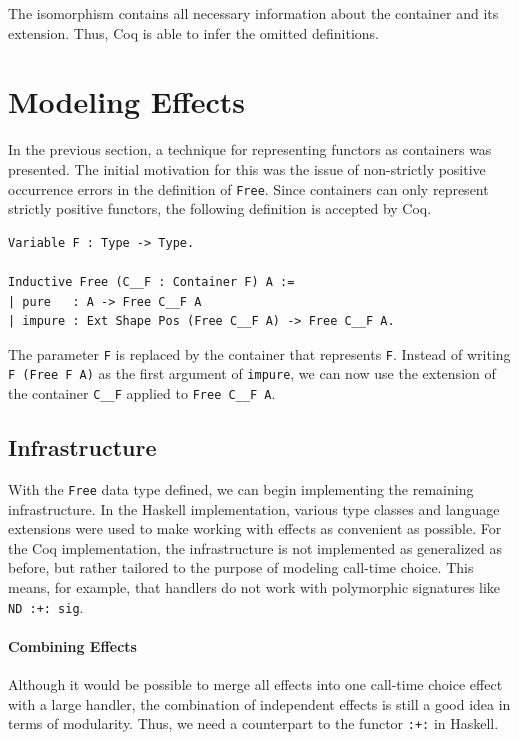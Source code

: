 \documentclass[a4paper, 11pt, fleqn, twoside]{scrreprt}
\newcommand{\hinl}[1]{\texttt{#1}}
\newcommand{\cinl}[1]{\texttt{#1}}
\begin{document}
The isomorphism contains all necessary information about the container and its extension.
Thus, Coq is able to infer the omitted definitions.

\section{Modeling Effects}

In the previous section, a technique for representing functors as containers was presented.
The initial motivation for this was the issue of non-strictly positive occurrence errors in the definition of \cinl{Free}.
Since containers can only represent strictly positive functors, the following definition is accepted by Coq.

\begin{verbatim}
Variable F : Type -> Type.

Inductive Free (C__F : Container F) A :=
| pure   : A -> Free C__F A
| impure : Ext Shape Pos (Free C__F A) -> Free C__F A.
\end{verbatim}

The parameter \cinl{F} is replaced by the container that represents \cinl{F}.
Instead of writing \cinl{F (Free F A)} as the first argument of \cinl{impure}, we can now use the extension of the container \cinl{C__F} applied to \cinl{Free C__F A}.

\subsection{Infrastructure}
\label{subsec:infrastructure}

With the \cinl{Free} data type defined, we can begin implementing the remaining infrastructure. 
In the Haskell implementation, various type classes and language extensions were used to make working with effects as convenient as possible.
For the Coq implementation, the infrastructure is not implemented as generalized as before, but rather tailored to the purpose of modeling call-time choice.
This means, for example, that handlers do not work with polymorphic signatures like \cinl{ND :+: sig}.

\paragraph{Combining Effects}
Although it would be possible to merge all effects into one call-time choice effect with a large handler, the combination of independent effects is still a good idea in terms of modularity.
Thus, we need a counterpart to the functor \hinl{:+:} in Haskell.
\end{document}
